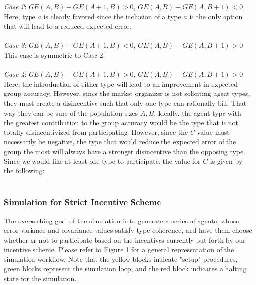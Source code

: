 \documentclass[twoside,twocolumn]{article}
\begin{document}
\textit{Case 2}: $GE(A,B) - GE(A+1,B)>0$, $GE(A,B) - GE(A,B+1)<0$\\

Here, type $a$ is clearly favored since the inclusion of a type $a$ is the only option that will lead to a reduced expected error. \\

\\

\textit{Case 3}: $GE(A,B) - GE(A+1,B)<0$, $GE(A,B) - GE(A,B+1)>0$\\

This case is symmetric to Case 2.\\

\\

\textit{Case 4}: $GE(A,B) - GE(A+1,B)>0$, $GE(A,B) - GE(A,B+1)>0$\\

Here, the introduction of either type will lead to an improvement in expected group accuracy. However, since the market organizer is not soliciting agent types, they must create a disincentive such that only one type can rationally bid. That way they can be sure of the population sizes $A,B$. Ideally, the agent type with the greatest contribution to the group accuracy would be the type that is not totally disincentivized from participating. However, since the $C$ value must necessarily be negative, the type that would reduce the expected error of the group the most will always have a stronger disincentive than the opposing type. Since we would like at least one type to participate, the value for $C$ is given by the following:\\

\\

\subsubsection{Simulation for Strict Incentive Scheme}

The overarching goal of the simulation is to generate a series of agents, whose error variance and covariance values satisfy type coherence, and have them choose whether or not to participate based on the incentives currently put forth by our incentive scheme. Please refer to Figure 1 for a general representation of the simulation workflow. Note that the yellow blocks indicate "setup" procedures, green blocks represent the simulation loop, and the red block indicates a halting state for the simulation.\\
\end{document}
